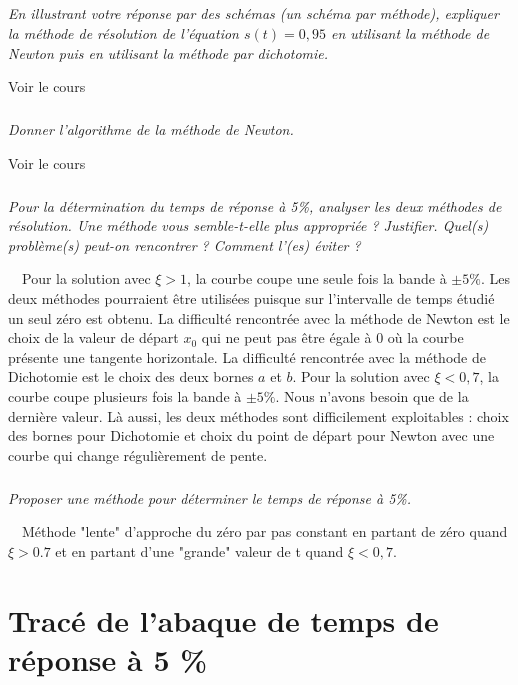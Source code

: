 \documentclass[10pt,fleqn]{article} %
\begin{document}
\subparagraph{}
\textit{En illustrant votre réponse par des schémas (un schéma par méthode), expliquer la méthode de résolution de l'équation $s(t)=0,95$ en utilisant la méthode de Newton puis en utilisant la méthode par dichotomie.}

\ifprof
\begin{corrige}
Voir le cours
\end{corrige}
\else
\fi


\subparagraph{}
\textit{Donner l'algorithme de la méthode de Newton.}

\ifprof
\begin{corrige}
Voir le cours
\end{corrige}
\else
\fi


\subparagraph{}
\textit{Pour la détermination du temps de réponse à 5\%, analyser les deux méthodes de résolution. Une méthode vous semble-t-elle plus appropriée ? Justifier. Quel(s) problème(s) peut-on rencontrer ? Comment l'(es) éviter ? }

\ifprof
\begin{corrige}~\
Pour la solution avec $\xi>1$, la courbe coupe une seule fois la bande à $\pm5\%$. Les deux méthodes pourraient être utilisées puisque sur l'intervalle de temps étudié un seul zéro est obtenu. La difficulté rencontrée avec la méthode de Newton est le choix de la valeur de départ $x_0$ qui ne peut pas être égale à 0 où la courbe présente une tangente horizontale.
La difficulté rencontrée avec la méthode de Dichotomie est le choix des deux bornes $a$ et $b$.
Pour la solution avec $\xi<0,7$, la courbe coupe plusieurs fois la bande à $\pm5\%$. Nous n'avons besoin que de la dernière valeur. Là aussi, les deux méthodes sont difficilement exploitables : choix des bornes pour Dichotomie et choix du point de départ pour Newton avec une courbe qui change régulièrement de pente.
\end{corrige}
\else
\fi

\subparagraph{}
\textit{Proposer une méthode pour déterminer le temps de réponse à 5\%. }

\ifprof
\begin{corrige}~\
Méthode "lente" d'approche du zéro par pas constant en partant de zéro quand $\xi>0.7$ et en partant d'une "grande" valeur de t quand $\xi<0,7$.
\end{corrige}
\else
\fi


\section{Tracé de l'abaque de temps de réponse à 5 \%}
\end{document}
